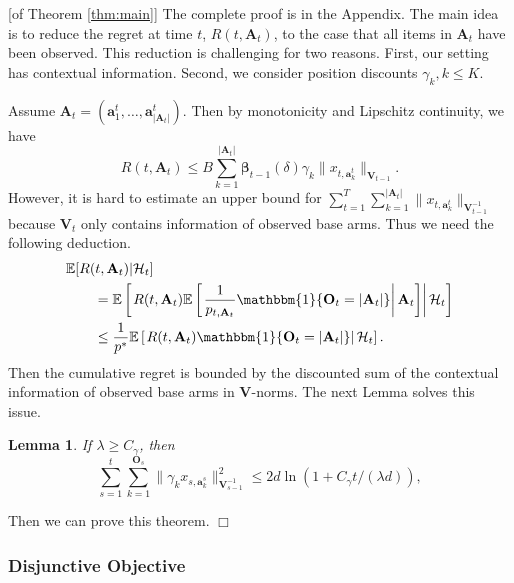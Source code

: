 \documentclass{article}
\newcommand{\bbeta}{\boldsymbol{\beta}}
\newcommand{\EE}{\mathbb{E}}
\newcommand{\bOne}{\mathbbm{1}}
\newcommand{\bA}{\mathbf{A}}
\newcommand{\ba}{\mathbf{a}}
\newcommand{\bO}{\mathbf{O}}
\newcommand{\bV}{\mathbf{V}}
\newcommand{\cH}{\mathcal{H}}
\newcommand{\abs}[1]{\left| #1 \right|}
\newcommand{\norm}[1]{\| #1 \|}
\newtheorem{lemma}[theorem]{Lemma}%
\newenvironment{proof}{\noindent {\textbf{Proof. }}}{$\Box$ \medskip}
\begin{document}
\begin{proof} [of Theorem \ref{thm:main}] %
	The complete proof is in the Appendix. The main idea is to reduce the regret at time $t$, $R(t, \bA_t)$, to the case that all items in $\bA_t$ have been observed. This reduction is challenging for two reasons. First, our setting has contextual information. Second, we consider position discounts $\gamma_k, k \leq K$. 
	
	Assume $\bA_t = (\ba_1^t, \ldots, \ba_{|\bA_t|}^t)$. Then by monotonicity and Lipschitz continuity, we have
	$$
		R(t, \bA_t) \leq B \sum_{k=1}^{|\bA_t|} \bbeta_{t-1}(\delta) \gamma_k \| x_{t, \ba_k^t} \|_{\bV_{t-1}}.
	$$
	However, it is hard to estimate an upper bound for $\sum_{t=1}^T \sum_{k=1}^{\abs{\bA_t}} \norm{ x_{t, \ba_k^t} }_{ \bV_{t-1}^{-1} }$ because $\bV_t$ only contains information of observed base arms. Thus we need the following deduction.
	\begin{align*}
    	&\EE[R(t, \bA_t)|\cH_t] \\
    	&\qquad = \EE \left[ \left. R(t, \bA_t) \EE \left[ \left. \frac{1}{p_{t, \bA_t}} \bOne\{\bO_t = \abs{\bA_t}\} \right| \bA_t \right]  \right| \cH_t \right]\\
    	&\qquad \leq \frac{1}{p^*} \EE \left[ \left. R(t, \bA_t) \bOne\{\bO_t = \abs{\bA_t}\} \right| \cH_t \right].
    \end{align*}
    Then the cumulative regret is bounded by the discounted sum of the contextual information of observed base arms in $\bV$-norms. The next Lemma solves this issue.
    \begin{lemma}
    	\label{lem:XNormSumEst}
    	If $\lambda \geq C_{\gamma}$, then
    	$$
    	\sum_{s=1}^t \sum_{k=1}^{\bO_s} \norm{\gamma_k x_{s,\ba_{k}^s}}_{\bV_{s-1}^{-1}}^2 \leq 2d\ln \left(1 + C_{\gamma}t/(\lambda d)\right),
    	$$
    \end{lemma}
    Then we can prove this theorem.
\end{proof}

\subsubsection{Disjunctive Objective}
\end{document}
